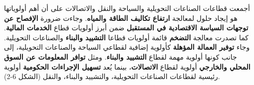 أجمعت قطاعات الصناعات التحويلية والسياحة والنقل والاتصالات على أن أهم أولوياتها هو إيجاد حلول لمعالجة \textbf{ارتفاع تكاليف الطاقة والمياه}. وجاءت ضرورة \textbf{الإفصاح عن توجهات السياسة الاقتصادية في المستقبل} ضمن أبرز أولويات قطاع \textbf{الخدمات المالية}. كما تصدرت معالجة \textbf{التضخم} قائمة أولويات قطاعا \textbf{التشييد والبناء} والصناعات التحويلية. وجاء \textbf{توفير العمالة المؤهلة} كأولوية إضافية لقطاعي السياحة والصناعات التحويلية، إلى جانب كونها أولوية مهمة لقطاع \textbf{التشييد والبناء}. ومثل \textbf{توافر المعلومات عن السوق المحلي والخارجي} أولوية لقطاع \textbf{الاتصالات}، بينما يُعد \textbf{تسهيل الإجراءات الحكومية} أولوية رئيسية لقطاعات الصناعات التحويلية، والتشييد والبناء، والنقل (الشكل 6-2).

